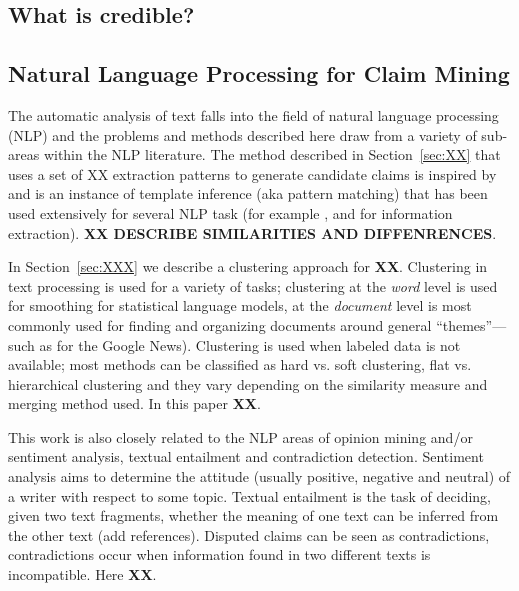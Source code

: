 \subsection{What is credible?}



\subsection{Natural Language Processing for Claim Mining}

The automatic analysis of text falls into the field of natural language processing (NLP) 
and the problems and methods described here draw from a variety of sub-areas within the NLP literature. 
The method described in Section~\ref{sec:XX} that uses a set of XX extraction patterns to generate 
candidate claims  is inspired by \cite{hearst92} and is an instance of template inference (aka pattern matching) 
that has been used extensively for several NLP task (for example \cite{Riloff93}, \cite{Jones99} and 
\cite{etzioni05} for information extraction). {\bf XX DESCRIBE SIMILARITIES AND DIFFENRENCES}. 

In Section~\ref{sec:XXX} we describe a clustering approach for {\bf XX}. 
Clustering in text processing is used for a variety  of tasks; clustering at the {\em word} level 
is used for smoothing for statistical language models, at the {\em document} level is most commonly 
used for finding and organizing documents around  general “themes”—such as for the Google News). 
Clustering is used when labeled data is not available; most methods can be classified as hard vs. 
soft clustering, flat vs. hierarchical clustering and they vary depending on the similarity measure 
and merging method used. In this paper {\bf XX}. 

This work is also closely related to the NLP areas of opinion mining and/or sentiment analysis, 
textual entailment and contradiction detection. Sentiment analysis aims to determine the attitude 
(usually positive, negative and neutral) of a writer with respect to some topic\cite{pangLee}. 
Textual entailment is the task of deciding, given two text fragments, whether the meaning of one 
text can be inferred from the other text (add references). Disputed claims can be seen as 
contradictions, contradictions occur when information found in two different texts is 
incompatible\cite{harabagiu}. Here {\bf XX}.


